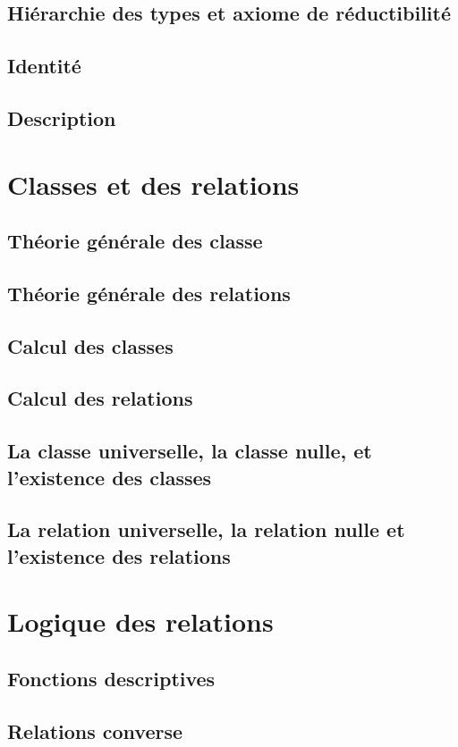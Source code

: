\documentclass[a4paper]{book}
\begin{document}
\section{Hiérarchie des types et axiome de réductibilité}
\section{Identité}
\section{Description}
\label{secDes}
\chapter{Classes et des relations}
\section{Théorie générale des classe}
\label{secGenClass}
\section{Théorie générale des relations}
\label{secGenRel}
\section{Calcul des classes}
\section{Calcul des relations}
\section{La classe universelle, la classe nulle, et l'existence des classes}
\section{La relation universelle, la relation nulle et l'existence des relations}
\chapter{Logique des relations}
\section{Fonctions descriptives}
\label{secFonctionDes}
\section{Relations converse}
\end{document}
